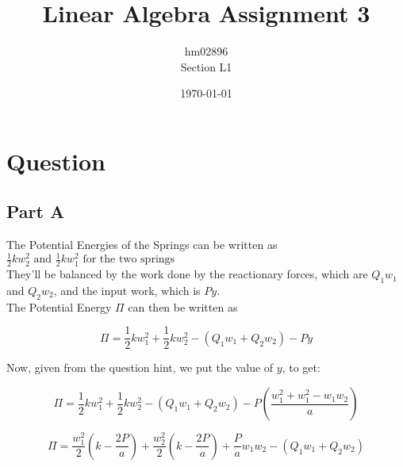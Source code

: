 \documentclass[12pt,a4paper]{article}
\title{Linear Algebra Assignment 3}
\author{hm02896 \\ Section L1}
\date{\today}
\begin{document}



\maketitle

\thispagestyle{fancy}

\section{Question}

\subsection{Part A}

The Potential Energies of the Springs can be written as
$\frac{1}{2}kw_2^2 \text{ and } \frac{1}{2}kw_1^2 \text{ for the two springs}$\\
They'll be balanced by the work done by the reactionary forces, which are $Q_1w_1$  and  $Q_2w_2$, and the input work, which is $Py$.\\
The Potential Energy $\Pi$ can then be written as

$$\Pi = \frac{1}{2}kw_1^2 + \frac{1}{2}kw_2^2 - (Q_1w_1 + Q_2w_2) - Py$$

Now, given from the question hint, we put the value of $y$, to get:

$$\Pi = \frac{1}{2}kw_1^2 + \frac{1}{2}kw_2^2 - (Q_1w_1 + Q_2w_2) -
P\left(\frac{w_1^2 + w_1^2 - w_1w_2}{a}\right)$$

$$\Pi = \frac{w_1^2}{2}\left(k-\frac{2P}{a}\right) + \frac{w_2^2}{2}\left(k-\frac{2P}{a}\right) + \frac{P}{a}w_1w_2 - (Q_1w_1 + Q_2w_2)$$
\end{document}
